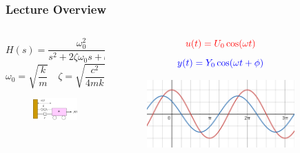 \documentclass[aspectratio=169]{beamer}
\begin{document}
\begin{frame}
	\frametitle{Lecture Overview}
	\begin{columns}
		\begin{column}{0.25\textwidth}
			\[
				H(s)
				= \frac{
					\omega_0^2
				}{
					s^2 + 2 \zeta \omega_0 s + \omega_0^2
				}
			\]
			\[
				\omega_0 = \sqrt{\frac{k}{m}}
				\quad
				\zeta = \sqrt{\frac{c^2}{4 m k}}
			\]
			\begin{figure}[]
				\includegraphics[width=\textwidth]{Images/SpringMassDamper_cartSystem.png}
			\end{figure}
		\end{column}
		\begin{column}{0.3\textwidth}
			\[
				\color{red}
				u(t) = U_0 \cos(\omega t)
			\]
			\[
				\color{blue}
				y(t) = Y_0 \cos(\omega t + \phi)
			\]
			\begin{figure}
				\includegraphics[width=\textwidth]{Images/phase_shift.png}
			\end{figure}
		\end{column}
		\begin{column}{0.4\textwidth}
			\begin{figure}

\end{figure}
\end{column}
\end{columns}
\end{frame}
\end{document}
